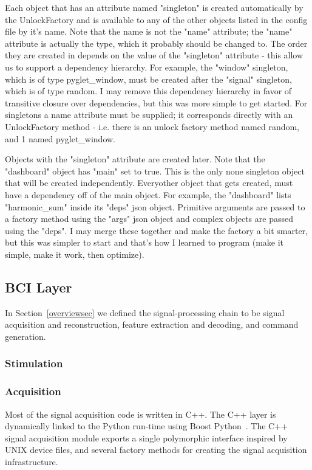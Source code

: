 \documentclass[11pt]{article}
\begin{document}
Each object that has an attribute named "singleton" is created automatically by the UnlockFactory and is available to any of the other objects listed in the config file by it's name.  Note that the name is not the "name" attribute; the "name" attribute is actually the type, which it probably should be changed to.  The order they are created in depends on the value of the "singleton" attribute - this allow us to support a dependency hierarchy.  For example, the "window" singleton, which is of type pyglet\_window, must be created after the "signal" singleton, which is of type random.  I may remove this dependency hierarchy in favor of transitive closure over dependencies, but this was more simple to get started.  For singletons a name attribute must be supplied; it corresponds directly with an UnlockFactory method - i.e. there is an unlock factory method named random, and 1 named pyglet\_window.

Objects with the "singleton" attribute are created later.   Note that the "dashboard" object has "main" set to true.  This is the only none singleton object that will be created independently.  Everyother object that gets created, must have a dependency off of the main object.  For example, the "dashboard" lists "harmonic\_sum" inside its "deps" json object.  Primitive arguments are passed to a factory method using the "args" json object and complex objects are passed using the "deps".  I may merge these together and make the factory a bit smarter, but this was simpler to start and that's how I learned to program (make it simple, make it work, then optimize).

\subsection{BCI Layer}\label{bcisec}

In Section~\ref{overviewsec} we defined the signal-processing chain to be signal acquisition and reconstruction, feature extraction and decoding, and command generation.

\subsubsection{Stimulation}

\subsubsection{Acquisition}

Most of the signal acquisition code is written in C++.  The C++ layer is dynamically linked to the Python run-time using Boost Python~\cite{boostpython}.  The C++ signal acquisition module exports a single polymorphic interface inspired by UNIX device files, and several factory methods for creating the signal acquisition infrastructure.
\end{document}
